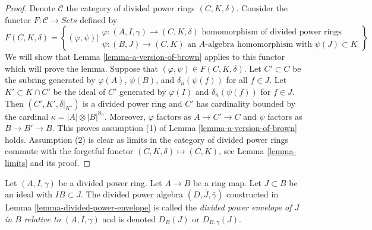 \begin{proof}
Denote $\mathcal{C}$ the category of divided power rings
$(C, K, \delta)$. Consider the functor
$F : \mathcal{C} \longrightarrow \textit{Sets}$ defined by
$$
F(C, K, \delta) =
\left\{
(\varphi, \psi)
\Big |
\begin{matrix}
\varphi : (A, I, \gamma) \to (C, K, \delta)
\text{ homomorphism of divided power rings} \\
\psi : (B, J) \to (C, K)\text{ an }
A\text{-algebra homomorphism with }\psi(J) \subset K
\end{matrix}
\right\}
$$
We will show that Lemma \ref{lemma-a-version-of-brown}
applies to this functor which will
prove the lemma. Suppose that $(\varphi, \psi) \in F(C, K, \delta)$.
Let $C' \subset C$ be the subring generated by $\varphi(A)$,
$\psi(B)$, and $\delta_n(\psi(f))$ for all $f \in J$.
Let $K' \subset K \cap C'$ be the ideal of $C'$ generated by
$\varphi(I)$ and $\delta_n(\psi(f))$ for $f \in J$.
Then $(C', K', \delta|_{K'})$ is a divided power ring and
$C'$ has cardinality bounded by the cardinal
$\kappa = |A| \otimes |B|^{\aleph_0}$.
Moreover, $\varphi$ factors as $A \to C' \to C$ and $\psi$ factors
as $B \to B' \to B$. This proves assumption (1) of
Lemma \ref{lemma-a-version-of-brown} holds. Assumption (2) is clear
as limits in the category of divided power rings commute with the
forgetful functor $(C, K, \delta) \mapsto (C, K)$, see
Lemma \ref{lemma-limits} and its proof.
\end{proof}

\begin{definition}
\label{definition-divided-power-envelope}
Let $(A, I, \gamma)$ be a divided power ring.
Let $A \to B$ be a ring map. Let $J \subset B$ be an ideal
with $IB \subset J$. The divided power algebra $(D, \bar J, \bar\gamma)$
constructed in Lemma \ref{lemma-divided-power-envelope}
is called the {\it divided power envelope of $J$ in $B$
relative to $(A, I, \gamma)$} and is denoted $D_B(J)$ or $D_{B, \gamma}(J)$.
\end{definition}

